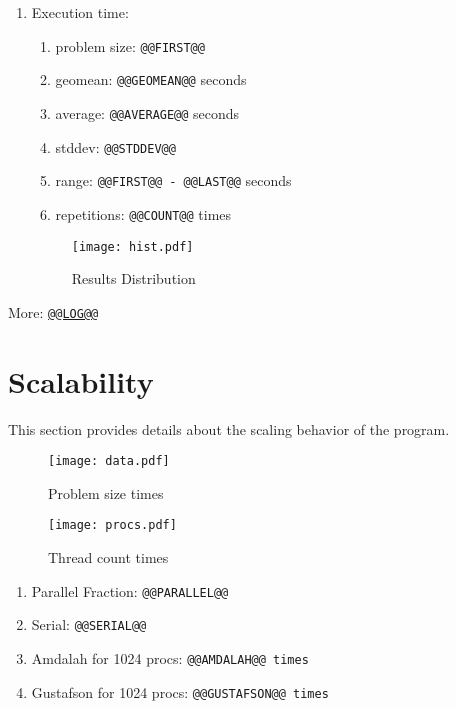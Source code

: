 \documentclass[a4paper, twocolumn]{article}
\begin{document}
\begin{enumerate}
\item Execution time:
\begin{enumerate}
\item problem size: {\tt @@FIRST@@}
\item geomean: {\tt @@GEOMEAN@@} seconds
\item average: {\tt @@AVERAGE@@} seconds
\item stddev: {\tt @@STDDEV@@}
\item range: {\tt @@FIRST@@ - @@LAST@@} seconds %
\item repetitions: {\tt @@COUNT@@} times
\end{enumerate}

\begin{figure}[H]
\label{fig:histogram}
\centering
\texttt{[image: hist.pdf]}
\caption{Results Distribution}
\end{figure}

\end{enumerate}

More: \href{TBD}{\tt @@LOG@@}

\section{Scalability}

This section provides details about the scaling behavior of the program.

\begin{figure}[H]
\label{fig:scaling}
\centering
\texttt{[image: data.pdf]}
\caption{Problem size times}
\end{figure}

\begin{figure}[H]
\label{fig:normal}
\centering
\texttt{[image: procs.pdf]}
\caption{Thread count times}
\end{figure}

\begin{enumerate}
\item Parallel Fraction: {\tt @@PARALLEL@@}
\item Serial: {\tt @@SERIAL@@}
\item Amdalah for 1024 procs: {\tt @@AMDALAH@@ times}
\item Gustafson for 1024 procs: {\tt @@GUSTAFSON@@ times}
\end{enumerate}
\end{document}
